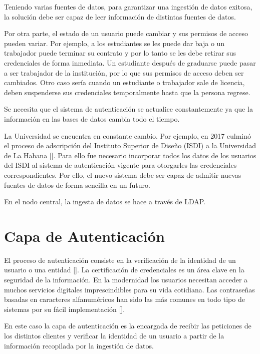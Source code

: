 Teniendo varias fuentes de datos, para garantizar una ingestión de datos exitosa, la solución debe ser capaz de leer información de distintas fuentes de datos. 

Por otra parte, el estado de un usuario puede cambiar y sus permisos de acceso pueden variar. Por ejemplo, a los estudiantes se les puede dar baja o un trabajador puede terminar su contrato y por lo tanto se les debe retirar sus credenciales de forma inmediata. Un estudiante después de graduarse puede pasar a ser trabajador de la institución, por lo que sus permisos de acceso deben ser cambiados. Otro caso sería cuando un estudiante o trabajador sale de licencia, deben suspenderse sus credenciales temporalmente hasta que la persona regrese. 

Se necesita que el sistema de autenticación se actualice constantemente ya que la información en las bases de datos cambia todo el tiempo.

La Universidad  se encuentra en constante cambio. Por ejemplo, en 2017 culminó el proceso de adscripción del Instituto Superior de Diseño (ISDI) a la Universidad de La Habana [\cite{isdi-historia}]. Para ello fue necesario incorporar todos los datos de los usuarios del ISDI al sistema de autenticación vigente para otorgarles las credenciales correspondientes. Por ello, el nuevo sistema debe ser capaz de admitir nuevas fuentes de datos de forma sencilla en un futuro. 

En el nodo central, la ingesta de datos se hace a través de LDAP.


\section*{Capa de Autenticación}
El proceso de autenticación consiste en la verificación de la identidad de un usuario o una entidad  [\cite{teheran2014mecanismo}]. La certificación de credenciales es un área clave en la seguridad de la información. En la modernidad los usuarios necesitan acceder a muchos servicios digitales imprescindibles para su vida cotidiana. Las contraseñas basadas en caracteres alfanuméricos han sido las más comunes en todo tipo de sistemas por su fácil implementación [\cite{rodriguez2018seguridad}].

En este caso la capa de autenticación es la encargada de recibir las peticiones de los distintos clientes y verificar la identidad de un usuario a partir de la información recopilada por la ingestión de datos.


